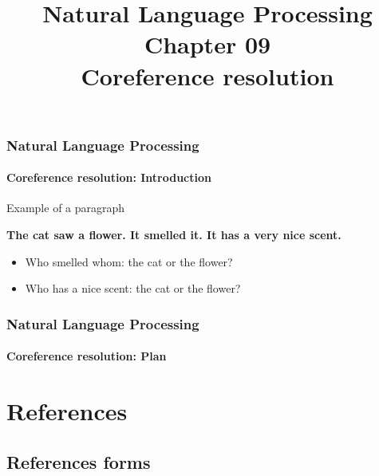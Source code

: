 \documentclass[xcolor=table]{beamer}
\title[ESI - NLP: 09- Coreference resolution]%
{Natural Language Processing\\Chapter 09\\Coreference resolution}
\begin{document}
	
\begin{frame}
\frametitle{Natural Language Processing}
\framesubtitle{Coreference resolution: Introduction}

\begin{exampleblock}{Example of a paragraph}
	\begin{center}
		\Large\bfseries
	The cat saw a flower. \textbf{\color{red}It} smelled \textbf{\color{red}it}. \textbf{\color{red}It} has a very nice scent.
	\end{center}
\end{exampleblock}

\begin{itemize}
	\item Who smelled whom: the cat or the flower?
	\item Who has a nice scent: the cat or the flower?
\end{itemize}

\end{frame}

%
%

\begin{frame}
\frametitle{Natural Language Processing}
\framesubtitle{Coreference resolution: Plan}

\begin{multicols}{2}
\tableofcontents
\end{multicols}
\end{frame}

\section{References}

\subsection{References forms}
\end{document}
